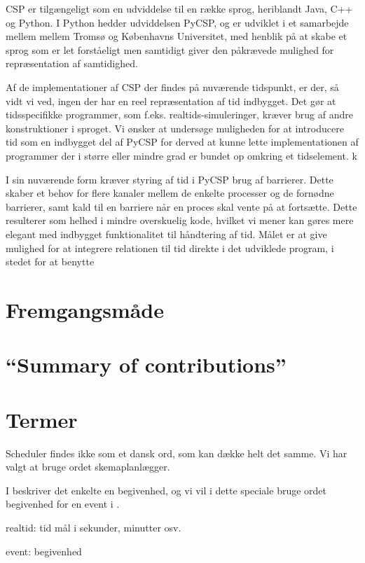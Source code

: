 CSP er tilgængeligt som en udviddelse til en række sprog, heriblandt Java, C++ 
og Python. I Python hedder udviddelsen PyCSP, og er udviklet i et samarbejde 
mellem mellem Tromsø og Københavns Universitet, med henblik på at skabe et 
sprog som er let forståeligt men samtidigt giver den påkrævede mulighed for 
repræsentation af samtidighed.  


Af de implementationer af CSP der findes på nuværende tidspunkt, er der, så 
vidt vi ved, ingen der har en reel repræsentation af tid indbygget. Det gør at 
tidsspecifikke programmer, som f.eks. realtids-simuleringer, kræver brug af 
andre konstruktioner i sproget.
Vi ønsker at undersøge muligheden for at introducere tid som en indbygget del 
af PyCSP for derved at kunne lette implementationen af programmer der i større 
eller mindre grad er bundet op omkring et tidselement. k


I sin nuværende form kræver styring af tid i PyCSP brug af 
barrierer. Dette skaber et 
behov for flere kanaler mellem de enkelte processer og de fornødne barrierer, 
samt kald til en barriere når en proces skal vente på at fortsætte.  Dette 
resulterer som helhed i mindre overskuelig kode, hvilket vi mener kan gøres 
mere elegant med indbygget funktionalitet til håndtering af tid. Målet er at 
give mulighed for at integrere relationen til tid direkte i det udviklede 
program, i stedet for at benytte 


  \section{Fremgangsmåde}
  \section{``Summary of contributions''}
  \section{Termer}

\begin{list}{}{}

\item Scheduler findes ikke som et dansk ord, som kan  dække helt det samme. Vi har valgt at bruge ordet skemaplanlægger.
\item I \des beskriver det enkelte  en begivenhed, og vi vil i dette speciale bruge ordet begivenhed for en event i \des. 
\item realtid: tid mål i sekunder, minutter osv.
\item event: begivenhed
\end{list}
